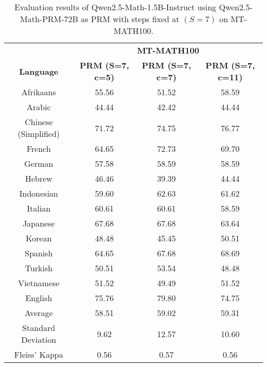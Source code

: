 \begin{table*}[]
\centering
\fontsize{10}{13} \selectfont
\begin{tabular}{c|c|c|c}
\toprule
 & \multicolumn{3}{c}{\textbf{MT-MATH100}} \\ \cmidrule{2-4}
\multirow{-2}{*}{\textbf{Language}} & \multicolumn{1}{c|}{\textbf{PRM (S=7, c=5)}} & \multicolumn{1}{c|}{\textbf{PRM (S=7, c=7)}} & \textbf{PRM (S=7, c=11)} \\ \midrule
Afrikaans & 55.56 & 51.52 & 58.59 \\
Arabic & 44.44 & 42.42 & 44.44 \\
Chinese (Simplified) & 71.72 & 74.75 & 76.77 \\
French & 64.65 & 72.73 & 69.70 \\
German & 57.58 & 58.59 & 58.59 \\
Hebrew & 46.46 & 39.39 & 44.44 \\
Indonesian & 59.60 & 62.63 & 61.62 \\
Italian & 60.61 & 60.61 & 58.59 \\
Japanese & 67.68 & 67.68 & 63.64 \\
Korean & 48.48 & 45.45 & 50.51 \\
Spanish & 64.65 & 67.68 & 68.69 \\
Turkish & 50.51 & 53.54 & 48.48 \\
Vietnamese & 51.52 & 49.49 & 51.52 \\
\rowcolor[HTML]{FCE5CD} 
English & 75.76 & 79.80 & 74.75 \\ \midrule
Average & 58.51 & 59.02 & 59.31 \\
Standard Deviation & 9.62 & 12.57 & 10.60 \\
Fleiss' Kappa & 0.56 & 0.57 & 0.56 \\ \bottomrule
\end{tabular}
\caption{\footnotesize Evaluation results of Qwen2.5-Math-1.5B-Instruct using Qwen2.5-Math-PRM-72B as PRM with steps fixed at \((S=7)\) on MT-MATH100.}
\label{tab:1_5B_prm_72B_s7}
\end{table*}

